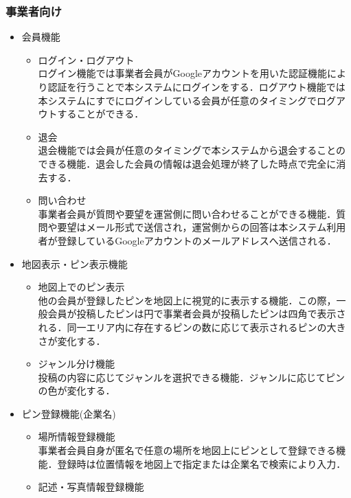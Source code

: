\subsubsection{事業者向け}
\begin{itemize}[itemsep=10pt]
    \item 会員機能
    \begin{itemize}[itemsep=10pt]
        \item ログイン・ログアウト \mbox{}\\
        ログイン機能では事業者会員がGoogleアカウントを用いた認証機能により認証を行うことで本システムにログインをする．ログアウト機能では本システムにすでにログインしている会員が任意のタイミングでログアウトすることができる．
        \item 退会 \mbox{}\\
        退会機能では会員が任意のタイミングで本システムから退会することのできる機能．退会した会員の情報は退会処理が終了した時点で完全に消去する．
        \item 問い合わせ \mbox{}\\
        事業者会員が質問や要望を運営側に問い合わせることができる機能．質問や要望はメール形式で送信され，運営側からの回答は本システム利用者が登録しているGoogleアカウントのメールアドレスへ送信される．
    \end{itemize}
    \item 地図表示・ピン表示機能
    \begin{itemize}[itemsep=10pt]
        \item 地図上でのピン表示 \mbox{}\\
        他の会員が登録したピンを地図上に視覚的に表示する機能．この際，一般会員が投稿したピンは円で事業者会員が投稿したピンは四角で表示される．同一エリア内に存在するピンの数に応じて表示されるピンの大きさが変化する．
        \item ジャンル分け機能 \mbox{}\\
        投稿の内容に応じてジャンルを選択できる機能．ジャンルに応じてピンの色が変化する．
    \end{itemize}
    \item ピン登録機能(企業名)
    \begin{itemize}[itemsep=10pt]
        \item 場所情報登録機能 \mbox{}\\
        事業者会員自身が匿名で任意の場所を地図上にピンとして登録できる機能．登録時は位置情報を地図上で指定または企業名で検索により入力．
        \item 記述・写真情報登録機能 \mbox{}\\

\end{itemize}
\end{itemize}
